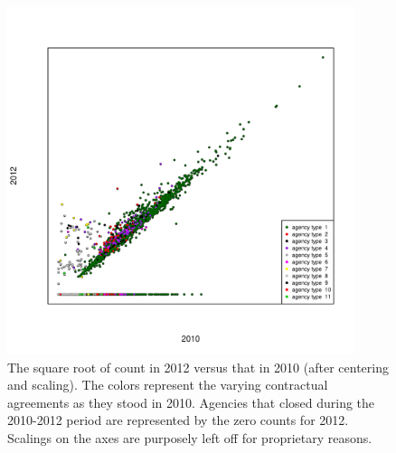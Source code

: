 \documentclass[12pt]{article}
\begin{document}
\begin{figure}[t]
\centering
\includegraphics[width=4in]{countvcount.pdf}
\caption{The square root of count in 2012 versus that in 2010 (after centering and scaling). The colors represent the varying contractual agreements as they stood in 2010.  Agencies that closed during the 2010-2012 period are represented by the zero counts for 2012. Scalings on the axes are purposely left off for proprietary reasons.}
\label{fig:ctVct}
\end{figure}
\end{document}
